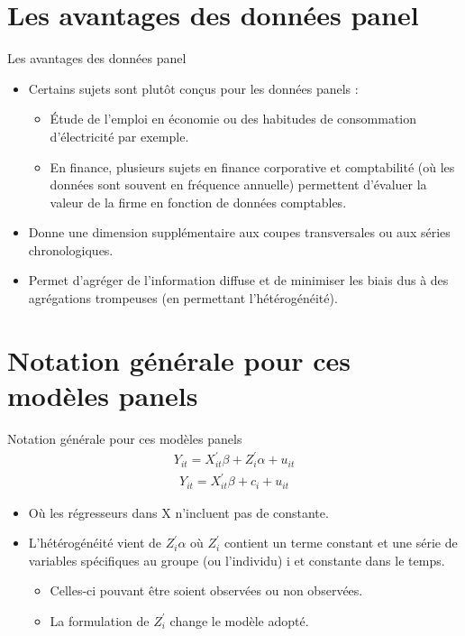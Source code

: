 \documentclass{beamer}
\begin{document}
\section{Les avantages des données panel}
\frame{\tableofcontents[current]}
\begin{frame}{Les avantages des données panel}
\begin{itemize}
\item Certains sujets sont plutôt conçus pour les données panels : 
\begin{itemize}
\item Étude de l’emploi en économie ou des habitudes de consommation d’électricité par exemple. 
\item En finance, plusieurs sujets en finance corporative et comptabilité (où les données sont souvent en fréquence annuelle) permettent d’évaluer la valeur de la firme en fonction de données comptables.
\end{itemize}
\item Donne une dimension supplémentaire aux coupes transversales ou aux séries chronologiques.
\item Permet d’agréger de l’information diffuse et de minimiser les biais dus à des agrégations trompeuses (en permettant l’hétérogénéité).

\end{itemize}
\end{frame}

\section{Notation générale pour ces modèles panels}
\frame{\tableofcontents[current]}
\begin{frame}{Notation générale pour ces modèles panels}
\begin{align*}
Y_{it}=X_{it}^{'}\beta + Z_i^{'}\alpha+u_{it}
\end{align*}
\begin{align*}
Y_{it}=X_{it}^{'}\beta +c_i+u_{it}
\end{align*}
\begin{itemize}
\item Où les régresseurs dans X n’incluent pas de constante.
\item L’hétérogénéité vient de $Z_i^{'}\alpha$ où $Z_i^{'}$ contient un terme constant et une série de variables spécifiques au groupe (ou l’individu) i et constante dans le temps.
\begin{itemize}
\item Celles-ci pouvant être soient observées ou non observées.
\item La formulation de $Z_{i}^{'}$ change le modèle adopté.
\end{itemize}
\end{itemize}
\end{frame}
\end{document}
